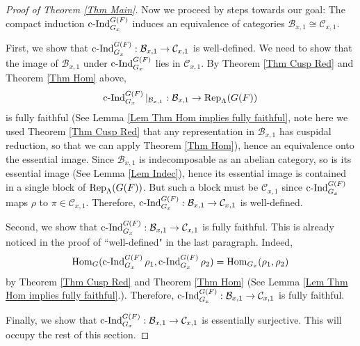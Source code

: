 	\begin{proof}[Proof of Theorem \ref{Thm Main}]
	
	Now we proceed by steps towards our goal: The compact induction $\operatorname{\operatorname{c-Ind}}_{G_x}^{G(F)}$ induces an equivalence of categories $\mathcal{B}_{x,1} \cong \mathcal{C}_{x,1}$. 
	
	First, we show that $\operatorname{\operatorname{c-Ind}}_{G_x}^{G(F)}: \mathcal{B}_{x,1} \to \mathcal{C}_{x,1}$ is well-defined. We need to show that the image of $\mathcal{B}_{x,1}$ under $\operatorname{\operatorname{c-Ind}}_{G_x}^{G(F)}$ lies in $\mathcal{C}_{x,1}$. By Theorem \ref{Thm Cusp Red} and Theorem \ref{Thm Hom} above, $$\operatorname{\operatorname{c-Ind}}_{G_x}^{G(F)}|_{\mathcal{B}_{x,1}}: \mathcal{B}_{x,1} \to \operatorname{\operatorname{Rep}}_{\Lambda}(G(F))$$
	is fully faithful (See Lemma \ref{Lem Thm Hom implies fully faithful}, note here we used Theorem \ref{Thm Cusp Red} that any representation in $\mathcal{B}_{x,1}$ has cuspidal reduction, so that we can apply Theorem \ref{Thm Hom}), hence an equivalence onto the essential image. Since $\mathcal{B}_{x,1}$ is indecomposable as an abelian category, so is its essential image (See Lemma \ref{Lem Indec}), hence its essential image is contained in a single block of $\operatorname{\operatorname{Rep}}_{\Lambda}(G(F))$. But such a block must be $\mathcal{C}_{x,1}$ since $\operatorname{\operatorname{c-Ind}}_{G_x}^{G(F)}$ maps $\rho$ to $\pi \in \mathcal{C}_{x,1}$. Therefore, $\operatorname{\operatorname{c-Ind}}_{G_x}^{G(F)}: \mathcal{B}_{x,1} \to \mathcal{C}_{x,1}$ is well-defined.
	
	Second, we show that $\operatorname{\operatorname{c-Ind}}_{G_x}^{G(F)}: \mathcal{B}_{x,1} \to \mathcal{C}_{x,1}$ is fully faithful. This is already noticed in the proof of ``well-defined" in the last paragraph. Indeed, 
	$$\operatorname{\operatorname{Hom}}_G(\operatorname{\operatorname{c-Ind}}_{G_x}^{G(F)}\rho_1, \operatorname{\operatorname{c-Ind}}_{G_x}^{G(F)}\rho_2)=\operatorname{\operatorname{Hom}}_{G_x}(\rho_1, \rho_2)$$
	by Theorem \ref{Thm Cusp Red} and Theorem \ref{Thm Hom} (See Lemma \ref{Lem Thm Hom implies fully faithful}.). Therefore, $\operatorname{\operatorname{c-Ind}}_{G_x}^{G(F)}: \mathcal{B}_{x,1} \to \mathcal{C}_{x,1}$ is fully faithful.
	
	Finally, we show that $\operatorname{\operatorname{c-Ind}}_{G_x}^{G(F)}: \mathcal{B}_{x,1} \to \mathcal{C}_{x,1}$ is essentially surjective. This will occupy the rest of this section. 
	

\end{proof}
